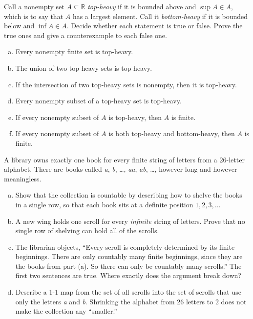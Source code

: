 \begin{problem}
Call a nonempty set $A \subseteq \mathbb{R}$ \emph{top-heavy} if it is bounded above and $\sup A \in A$, which is to say that $A$ has a largest element.  Call it \emph{bottom-heavy} if it is bounded below and $\inf A \in A$.  Decide whether each statement is true or false.  Prove the true ones and give a counterexample to each false one.
\begin{enumerate}[(a)]
	\item Every nonempty finite set is top-heavy.
	\item The union of two top-heavy sets is top-heavy.
	\item If the intersection of two top-heavy sets is nonempty, then it is top-heavy.
	\item Every nonempty subset of a top-heavy set is top-heavy.
	\item If every nonempty subset of $A$ is top-heavy, then $A$ is finite.
	\item If every nonempty subset of $A$ is both top-heavy and bottom-heavy, then $A$ is finite.
\end{enumerate}
\end{problem}

\begin{problem}
A library owns exactly one book for every finite string of letters from a 26-letter alphabet.  There are books called \emph{a}, \emph{b}, \ldots, \emph{aa}, \emph{ab}, \ldots, however long and however meaningless.
\begin{enumerate}[(a)]
	\item Show that the collection is countable by describing how to shelve the books in a single row, so that each book sits at a definite position $1, 2, 3, \ldots$
	\item A new wing holds one scroll for every \emph{infinite} string of letters.  Prove that no single row of shelving can hold all of the scrolls.
	\item The librarian objects, ``Every scroll is completely determined by its finite beginnings.  There are only countably many finite beginnings, since they are the books from part (a).  So there can only be countably many scrolls.''  The first two sentences are true.  Where exactly does the argument break down?
	\item Describe a 1-1 map from the set of all scrolls into the set of scrolls that use only the letters \emph{a} and \emph{b}.  Shrinking the alphabet from 26 letters to 2 does not make the collection any ``smaller.''
\end{enumerate}
\end{problem}
